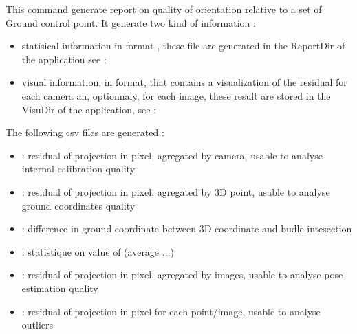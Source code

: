 \documentclass[a4paper]{article}
\begin{document}
\CmdTitle

\tableofcontents



\SecDescr

This command generate report on quality of orientation relative to a set of Ground
control point. It generate two kind of information :

\begin{itemize}
  \item statisical information in  format , these file are generated in the  ReportDir of the application
        see  \RefSecCSVRes ;
  \item visual information, in   format, that contains a visualization of the residual for each camera an, optionnaly, for each image,
        these result are stored in the VisuDir of the application, see \RefSecVisuRes;
\end{itemize}


\SecCSVRes

The following csv files are generated :
\begin{itemize}
  \item {}  : residual of projection in pixel, agregated by camera, usable to analyse internal calibration quality
  \item {}  : residual of projection in pixel, agregated by 3D point, usable to analyse ground coordinates quality
  \item {}  : difference in ground coordinate between 3D coordinate and budle intesection
  \item {}  : statistique on value of   (average ...)
  \item {} : residual of projection in pixel, agregated by images, usable to analyse pose estimation quality
  \item {} : residual of projection in pixel for each point/image, usable to analyse outliers
\end{itemize}


\end{document}
